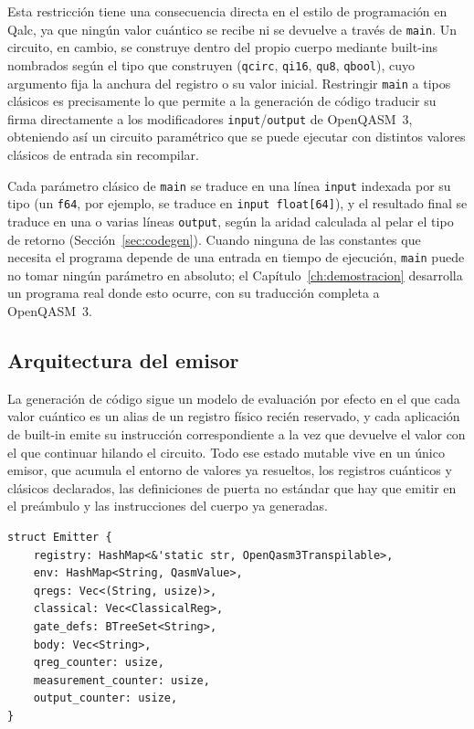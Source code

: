 Esta restricción tiene una consecuencia directa en el estilo de programación en Qalc, ya que ningún valor cuántico se recibe ni se devuelve a través de \lstinline|main|. Un circuito, en cambio, se construye dentro del propio cuerpo mediante built-ins nombrados según el tipo que construyen (\lstinline|qcirc|, \lstinline|qi16|, \lstinline|qu8|, \lstinline|qbool|), cuyo argumento fija la anchura del registro o su valor inicial. Restringir \lstinline|main| a tipos clásicos es precisamente lo que permite a la generación de código traducir su firma directamente a los modificadores \lstinline|input|/\lstinline|output| de OpenQASM~3, obteniendo así un circuito paramétrico que se puede ejecutar con distintos valores clásicos de entrada sin recompilar.

Cada parámetro clásico de \lstinline|main| se traduce en una línea \lstinline|input| indexada por su tipo (un \lstinline|f64|, por ejemplo, se traduce en \lstinline|input float[64]|), y el resultado final se traduce en una o varias líneas \lstinline|output|, según la aridad calculada al pelar el tipo de retorno (Sección~\ref{sec:codegen}). Cuando ninguna de las constantes que necesita el programa depende de una entrada en tiempo de ejecución, \lstinline|main| puede no tomar ningún parámetro en absoluto; el Capítulo~\ref{ch:demostracion} desarrolla un programa real donde esto ocurre, con su traducción completa a OpenQASM~3.

\subsection{Arquitectura del emisor}
\label{sec:emitter}

La generación de código sigue un modelo de evaluación por efecto en el que cada valor cuántico es un alias de un registro físico recién reservado, y cada aplicación de built-in emite su instrucción correspondiente a la vez que devuelve el valor con el que continuar hilando el circuito. Todo ese estado mutable vive en un único emisor, que acumula el entorno de valores ya resueltos, los registros cuánticos y clásicos declarados, las definiciones de puerta no estándar que hay que emitir en el preámbulo y las instrucciones del cuerpo ya generadas.

\begin{lstlisting}[language={}, caption=Estado mutable del emisor durante la generación de código]
struct Emitter {
    registry: HashMap<&'static str, OpenQasm3Transpilable>,
    env: HashMap<String, QasmValue>,
    qregs: Vec<(String, usize)>,
    classical: Vec<ClassicalReg>,
    gate_defs: BTreeSet<String>,
    body: Vec<String>,
    qreg_counter: usize,
    measurement_counter: usize,
    output_counter: usize,
}
\end{lstlisting}

